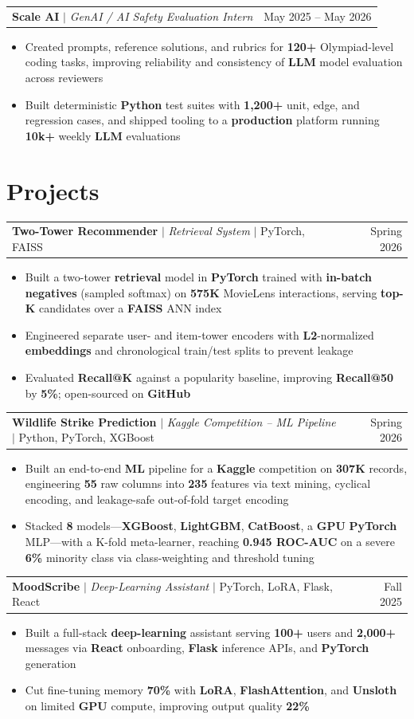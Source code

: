 \documentclass[letterpaper,10pt]{article}
\makeatletter
\newcommand{\resumeWorkHeading}[2]{%
  \vspace{2pt}\noindent
  \begin{tabular*}{\textwidth}{@{}l@{\extracolsep{\fill}}r@{}}
    #1 & #2 \\
  \end{tabular*}%
  \vspace{-2pt}
}
\newcommand{\resumeItemListStart}{\begin{itemize}}
\newcommand{\resumeItemListEnd}{\end{itemize}\vspace{3pt}}
\newcommand{\resumeItem}[1]{\item #1}
\makeatother
\begin{document}
\resumeWorkHeading
{\textbf{Scale AI} $|$ \emph{GenAI / AI Safety Evaluation Intern}}{May 2025 -- May 2026}
\resumeItemListStart
\resumeItem{Created prompts, reference solutions, and rubrics for \textbf{120+} Olympiad-level coding tasks, improving reliability and consistency of \textbf{LLM} model evaluation across reviewers}
\resumeItem{Built deterministic \textbf{Python} test suites with \textbf{1,200+} unit, edge, and regression cases, and shipped tooling to a \textbf{production} platform running \textbf{10k+} weekly \textbf{LLM} evaluations}
\resumeItemListEnd

\section{Projects}
\resumeWorkHeading
{\textbf{Two-Tower Recommender} $|$ \emph{Retrieval System} $|$ PyTorch, FAISS}{Spring 2026}
\resumeItemListStart
\resumeItem{Built a two-tower \textbf{retrieval} model in \textbf{PyTorch} trained with \textbf{in-batch negatives} (sampled softmax) on \textbf{575K} MovieLens interactions, serving \textbf{top-K} candidates over a \textbf{FAISS} ANN index}
\resumeItem{Engineered separate user- and item-tower encoders with \textbf{L2}-normalized \textbf{embeddings} and chronological train/test splits to prevent leakage}
\resumeItem{Evaluated \textbf{Recall@K} against a popularity baseline, improving \textbf{Recall@50} by \textbf{5\%}; open-sourced on \textbf{GitHub}}
\resumeItemListEnd

\resumeWorkHeading
{\textbf{Wildlife Strike Prediction} $|$ \emph{Kaggle Competition -- ML Pipeline} $|$ Python, PyTorch, XGBoost}{Spring 2026}
\resumeItemListStart
\resumeItem{Built an end-to-end \textbf{ML} pipeline for a \textbf{Kaggle} competition on \textbf{307K} records, engineering \textbf{55} raw columns into \textbf{235} features via text mining, cyclical encoding, and leakage-safe out-of-fold target encoding}
\resumeItem{Stacked \textbf{8} models---\textbf{XGBoost}, \textbf{LightGBM}, \textbf{CatBoost}, a \textbf{GPU} \textbf{PyTorch} MLP---with a K-fold meta-learner, reaching \textbf{0.945 ROC-AUC} on a severe \textbf{6\%} minority class via class-weighting and threshold tuning}
\resumeItemListEnd

\resumeWorkHeading
{\textbf{MoodScribe} $|$ \emph{Deep-Learning Assistant} $|$ PyTorch, LoRA, Flask, React}{Fall 2025}
\resumeItemListStart
\resumeItem{Built a full-stack \textbf{deep-learning} assistant serving \textbf{100+} users and \textbf{2,000+} messages via \textbf{React} onboarding, \textbf{Flask} inference APIs, and \textbf{PyTorch} generation}
\resumeItem{Cut fine-tuning memory \textbf{70\%} with \textbf{LoRA}, \textbf{FlashAttention}, and \textbf{Unsloth} on limited \textbf{GPU} compute, improving output quality \textbf{22\%}}
\resumeItemListEnd
\end{document}
